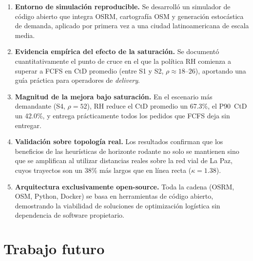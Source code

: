 \documentclass[12pt,letterpaper,oneside]{book}
\begin{document}
	\begin{enumerate}
		\item \textbf{Entorno de simulación reproducible.}  Se desarrolló un simulador
		      de código abierto que integra OSRM, cartografía OSM y generación
		      estocástica de demanda, aplicado por primera vez a una ciudad
		      latinoamericana de escala media.
		\item \textbf{Evidencia empírica del efecto de la saturación.}  Se documentó
		      cuantitativamente el punto de cruce en el que la política RH comienza
		      a superar a FCFS en CtD promedio (entre S1 y S2, $\rho \approx 18$--$26$),
		      aportando una guía práctica para operadores de \emph{delivery}.
		\item \textbf{Magnitud de la mejora bajo saturación.}  En el escenario más
		      demandante (S4, $\rho = 52$), RH reduce el CtD promedio un 67.3\%,
		      el P90~CtD un 42.0\%, y entrega prácticamente todos los pedidos que FCFS
		      deja sin entregar.
		\item \textbf{Validación sobre topología real.}  Los resultados confirman que
		      los beneficios de las heurísticas de horizonte rodante no solo se
		      mantienen sino que se amplifican al utilizar distancias reales sobre
		      la red vial de La Paz, cuyos trayectos son un 38\% más largos que en
		      línea recta ($\kappa = 1{.}38$).
		\item \textbf{Arquitectura exclusivamente open-source.}  Toda la cadena
		      (OSRM, OSM, Python, Docker) se basa en herramientas de código
		      abierto, demostrando la viabilidad de soluciones de optimización
		      logística sin dependencia de software propietario.
	\end{enumerate}

	\section{Trabajo futuro}
\end{document}
